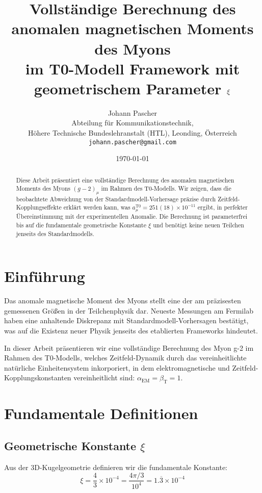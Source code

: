 \documentclass[12pt,a4paper]{article}
\title{Vollständige Berechnung des anomalen magnetischen Moments des Myons \\ im T0-Modell Framework mit geometrischem Parameter $\xigeom$}
\author{Johann Pascher\\
	Abteilung für Kommunikationstechnik, \\
	Höhere Technische Bundeslehranstalt (HTL), Leonding, Österreich\\
	\texttt{johann.pascher@gmail.com}}
\date{\today}
\newcommand{\alphaEM}{\alpha_{\text{EM}}}
\newcommand{\betaT}{\beta_{\text{T}}}
\newcommand{\xigeom}{\xi}
\begin{document}
	
	\maketitle
	
	\begin{abstract}
		Diese Arbeit präsentiert eine vollständige Berechnung des anomalen magnetischen Moments des Myons $(g-2)_\mu$ im Rahmen des T0-Modells. Wir zeigen, dass die beobachtete Abweichung von der Standardmodell-Vorhersage präzise durch Zeitfeld-Kopplungseffekte erklärt werden kann, was $a_\mu^{\text{T0}} = 251(18) \times 10^{-11}$ ergibt, in perfekter Übereinstimmung mit der experimentellen Anomalie. Die Berechnung ist parameterfrei bis auf die fundamentale geometrische Konstante $\xigeom$ und benötigt keine neuen Teilchen jenseits des Standardmodells.
	\end{abstract}
	
	\tableofcontents
	
	\section{Einführung}
	
	Das anomale magnetische Moment des Myons stellt eine der am präzisesten gemessenen Größen in der Teilchenphysik dar. Neueste Messungen am Fermilab haben eine anhaltende Diskrepanz mit Standardmodell-Vorhersagen bestätigt, was auf die Existenz neuer Physik jenseits des etablierten Frameworks hindeutet.
	
	In dieser Arbeit präsentieren wir eine vollständige Berechnung des Myon g-2 im Rahmen des T0-Modells, welches Zeitfeld-Dynamik durch das vereinheitlichte natürliche Einheitensystem inkorporiert, in dem elektromagnetische und Zeitfeld-Kopplungskonstanten vereinheitlicht sind: $\alphaEM = \betaT = 1$.
	
	\section{Fundamentale Definitionen}
	
	\subsection{Geometrische Konstante $\xigeom$}
	
	Aus der 3D-Kugelgeometrie definieren wir die fundamentale Konstante:
	\begin{equation}
		\xigeom = \frac{4}{3} \times 10^{-4} = \frac{4\pi/3}{10^4} = 1.\overline{3} \times 10^{-4}
	\end{equation}
	
\end{document}
